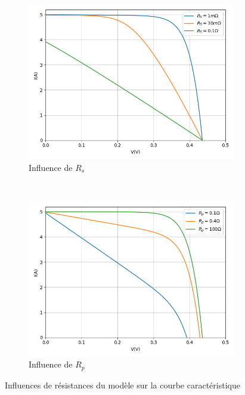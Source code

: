 \begin{figure}[h]
  \begin{subfigure}[b]{.48\textwidth}
    \begin{center}
      \includegraphics[width=\textwidth]{resources/rsinf.png}
      \caption{Influence de $R_s$}
    \end{center}
  \end{subfigure}
  ~
  \begin{subfigure}[b]{.48\textwidth}
    \begin{center}
      \includegraphics[width=\textwidth]{resources/rpinf.png}
      \caption{Influence de $R_p$}
    \end{center}
  \end{subfigure}
  \caption{Influences de résistances du modèle sur la courbe caractéristique}
  \label{fig:rinf}
\end{figure}

